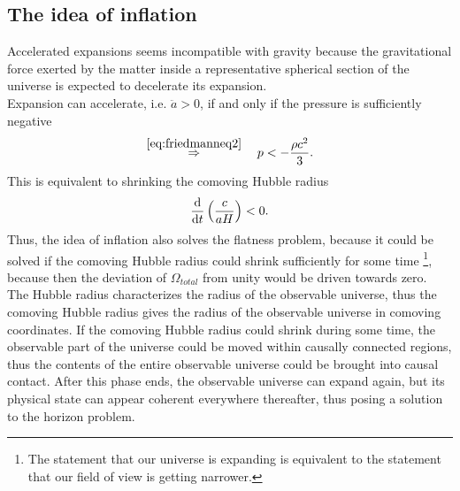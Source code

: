 \subsection{The idea of inflation}
Accelerated expansions seems incompatible with gravity because the gravitational force exerted by the matter inside a representative spherical section of the universe is expected to decelerate its expansion.\\
Expansion can accelerate, i.e. $\ddot{a}>0$, if and only if the pressure is sufficiently negative
\begin{equation}
\stackrel{\ref{eq:friedmanneq2}}{\Rightarrow} \quad p< - \frac{\rho c^2}{3}.
\end{equation}
This is equivalent to shrinking the comoving Hubble radius
\begin{equation}
	\frac{\mathrm{d}}{\mathrm{d} t} \left(\frac{c}{a H}\right) <0.
\end{equation}
Thus, the idea of inflation also solves the flatness problem, because it could be solved if the comoving Hubble radius could shrink sufficiently for some time \footnote{The statement that our universe is expanding is equivalent to the statement that our field of view is getting narrower.}, because then the deviation of $\Omega_{total}$ from unity would be driven towards zero.\\ The Hubble radius characterizes the radius of the observable universe, thus the comoving Hubble radius gives the radius of the observable universe in comoving coordinates. If the comoving Hubble radius could shrink during some time, the observable part of the universe could be moved within causally connected regions, thus the contents of the entire observable universe could be brought into causal contact. After this phase ends, the observable universe can expand again, but its physical state can appear coherent everywhere thereafter, thus posing a solution to the horizon problem.
